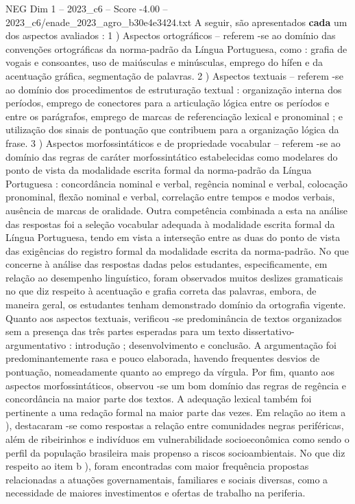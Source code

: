 \begin{textsample}{NEG Dim 1 – 2023\_c6 – Score -4.00 – 2023\_c6/enade\_2023\_agro\_b30e4e3424.txt}
A seguir, são apresentados \textbf{cada} um dos aspectos avaliados : 1 ) Aspectos ortográficos – referem -se ao domínio das convenções ortográficas da norma-padrão da Língua Portuguesa, como : grafia de vogais e consoantes, uso de maiúsculas e minúsculas, emprego do hífen e da acentuação gráfica, segmentação de palavras. 2 ) Aspectos textuais – referem -se ao domínio dos procedimentos de estruturação textual : organização interna dos períodos, emprego de conectores para a articulação lógica entre os períodos e entre os parágrafos, emprego de marcas de referenciação lexical e pronominal ; e utilização dos sinais de pontuação que contribuem para a organização lógica da frase. 3 ) Aspectos morfossintáticos e de propriedade vocabular – referem -se ao domínio das regras de caráter morfossintático estabelecidas como modelares do ponto de vista da modalidade escrita formal da norma-padrão da Língua Portuguesa : concordância nominal e verbal, regência nominal e verbal, colocação pronominal, flexão nominal e verbal, correlação entre tempos e modos verbais, ausência de marcas de oralidade.
Outra competência combinada a esta na análise das respostas foi a seleção vocabular adequada à modalidade escrita formal da Língua Portuguesa, tendo em vista a interseção entre as duas do ponto de vista das exigências do registro formal da modalidade escrita da norma-padrão.
No que concerne à análise das respostas dadas pelos estudantes, especificamente, em relação ao desempenho linguístico, foram observados muitos deslizes gramaticais no que diz respeito à acentuação e grafia correta das palavras, embora, de maneira geral, os estudantes tenham demonstrado domínio da ortografia vigente.
Quanto aos aspectos textuais, verificou -se predominância de textos organizados sem a presença das três partes esperadas para um texto dissertativo-argumentativo : introdução ; desenvolvimento e conclusão.
A argumentação foi predominantemente rasa e pouco elaborada, havendo frequentes desvios de pontuação, nomeadamente quanto ao emprego da vírgula.
Por fim, quanto aos aspectos morfossintáticos, observou -se um bom domínio das regras de regência e concordância na maior parte dos textos.
A adequação lexical também foi pertinente a uma redação formal na maior parte das vezes.
Em relação ao item a ), destacaram -se como respostas a relação entre comunidades negras periféricas, além de ribeirinhos e indivíduos em vulnerabilidade socioeconômica como sendo o perfil da população brasileira mais propenso a riscos socioambientais.
No que diz respeito ao item b ), foram encontradas com maior frequência propostas relacionadas a atuações governamentais, familiares e sociais diversas, como a necessidade de maiores investimentos e ofertas de trabalho na periferia.

\end{textsample}
